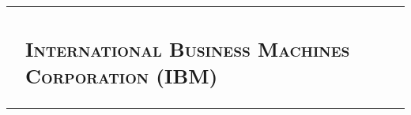 \documentclass[letterpaper,10pt]{article}
\begin{document}
\begin{tabular}{R|p{6.2in}}
	                               & \subsection{\textsc{International Business Machines Corporation (IBM)}}                                                                                                                                                                                                                                                                                                                                                                                                                                                                                                                                                                                                                                                                                                                                                                                                                                                                                                                                                                                                                                                                                                                                                                           \\


\end{tabular}
\end{document}
